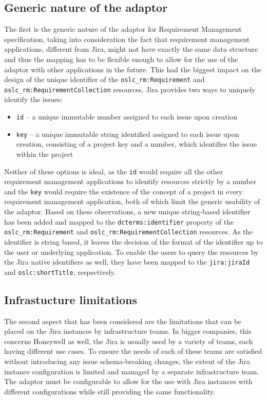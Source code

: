 \subsection*{Generic nature of the adaptor}
The first is the generic nature of the adaptor for Requirement Management specification, taking into consideration the fact that requirement management applications, different from Jira, might not have exactly the same data structure and thus the mapping has to be flexible enough to allow for the use of the adaptor with other applications in the future. This had the biggest impact on the design of the unique identifier of the \texttt{oslc\_rm:Requirement} and \texttt{oslc\_rm:RequirementCollection} resources. Jira provides two ways to uniquely identify the issues:

\begin{itemize}
  \item \texttt{id} -- a unique immutable number assigned to each issue upon creation
  \item \texttt{key} -- a unique immutable string identified assigned to each issue upon creation, consisting of a project key and a number, which identifies the issue within the project
\end{itemize}

Neither of these options is ideal, as the \texttt{id} would require all the other requirement management applications to identify resources strictly by a number and the \texttt{key} would require the existence of the concept of a project in every requirement management application, both of which limit the generic usability of the adaptor. Based on these observations, a new unique string-based identifier has been added and mapped to the \texttt{dcterms:identifier} property of the \texttt{oslc\_rm:Requirement} and \texttt{oslc\_rm:RequirementCollection} resources. As the identifier is string based, it leaves the decision of the format of the identifier up to the user or underlying application. To enable the users to query the resources by the Jira native identifiers as well, they have been mapped to the \texttt{jira:jiraId} and \texttt{oslc:shortTitle}, respectively.

\subsection*{Infrastucture limitations}
\label{sec:infrastructure_limitations}
The second aspect that has been considered are the limitations that can be placed on the Jira instances by infrastructure teams. In bigger companies, this concerns Honeywell as well, the Jira is usually used by a variety of teams, each having different use cases. To ensure the needs of each of these teams are satisfied without introducing any issue schema-breaking changes, the extent of the Jira instance configuration is limited and managed by a separate infrastructure team. The adaptor must be configurable to allow for the use with Jira instances with different configurations while still providing the same functionality.


